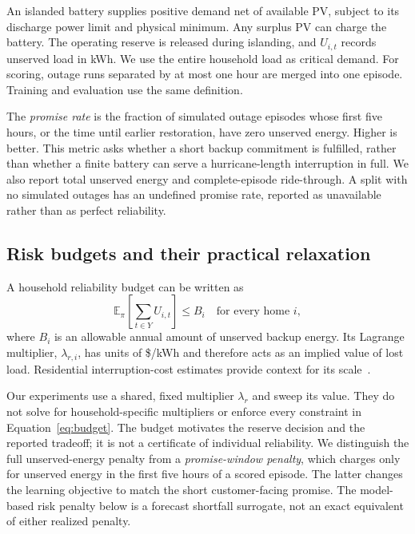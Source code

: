 An islanded battery supplies positive demand net of available PV, subject to its discharge power limit and physical minimum. Any surplus PV can charge the battery. The operating reserve is released during islanding, and $U_{i,t}$ records unserved load in kWh. We use the entire household load as critical demand. For scoring, outage runs separated by at most one hour are merged into one episode. Training and evaluation use the same definition.

The \emph{promise rate} is the fraction of simulated outage episodes whose first five hours, or the time until earlier restoration, have zero unserved energy. Higher is better. This metric asks whether a short backup commitment is fulfilled, rather than whether a finite battery can serve a hurricane-length interruption in full. We also report total unserved energy and complete-episode ride-through. A split with no simulated outages has an undefined promise rate, reported as unavailable rather than as perfect reliability.

\subsection{Risk budgets and their practical relaxation}

A household reliability budget can be written as
\begin{equation}
 \mathbb E_\pi\!\left[\sum_{t\in Y}U_{i,t}\right]\le B_i \quad\text{for every home }i,
 \label{eq:budget}
\end{equation}
where $B_i$ is an allowable annual amount of unserved backup energy. Its Lagrange multiplier, $\lambda_{r,i}$, has units of \$/kWh and therefore acts as an implied value of lost load. Residential interruption-cost estimates provide context for its scale~\citep{ice2025,brown2024reliability}.

Our experiments use a shared, fixed multiplier $\lambda_r$ and sweep its value. They do not solve for household-specific multipliers or enforce every constraint in Equation~\eqref{eq:budget}. The budget motivates the reserve decision and the reported tradeoff; it is not a certificate of individual reliability. We distinguish the full unserved-energy penalty from a \emph{promise-window penalty}, which charges only for unserved energy in the first five hours of a scored episode. The latter changes the learning objective to match the short customer-facing promise. The model-based risk penalty below is a forecast shortfall surrogate, not an exact equivalent of either realized penalty.

